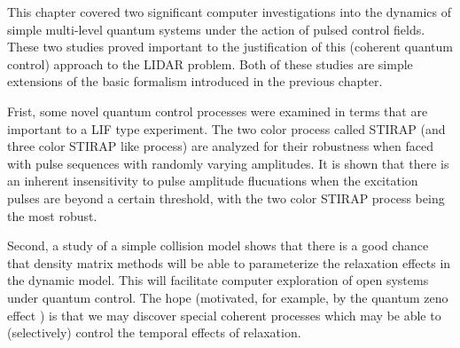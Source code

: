 
This chapter covered two significant computer investigations into the dynamics of simple multi-level quantum systems under the action of pulsed control fields. These two studies proved important to the justification of this (coherent quantum control) approach to the LIDAR problem. Both of these studies are simple extensions of the basic formalism introduced in the previous chapter.

Frist, some novel quantum control processes were examined in terms that are important to a LIF type experiment. The two color process called STIRAP (and three color STIRAP like process) are analyzed for their robustness when faced with pulse sequences with randomly varying amplitudes. It is shown that there is an inherent insensitivity to pulse amplitude flucuations when the excitation pulses are beyond a certain threshold, with the two color STIRAP process being the most robust.

Second, a study of a simple collision model shows that there is a good chance that density matrix methods will be able to parameterize the relaxation effects in the dynamic model.  This will facilitate computer exploration of open systems under quantum control. The hope (motivated, for example, by the quantum zeno effect \cite{Luis:2001a}) is that we may discover special coherent processes which may be able to (selectively) control the temporal effects of relaxation.

